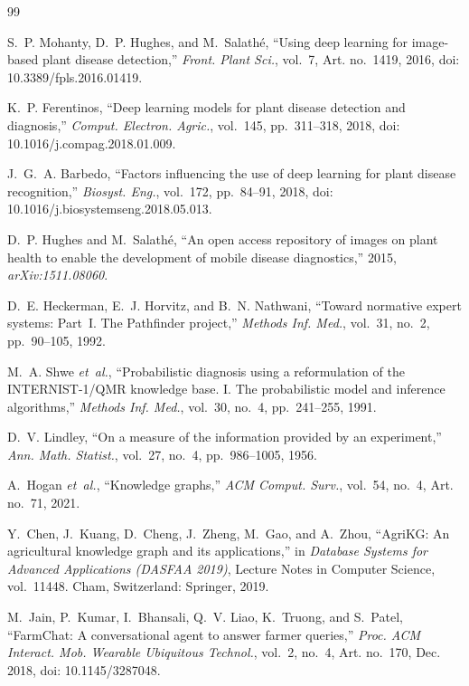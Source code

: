 \documentclass[conference]{IEEEtran}
\begin{document}
\begin{thebibliography}{99}
\footnotesize

S.~P. Mohanty, D.~P. Hughes, and M.~Salath\'{e}, ``Using deep learning for image-based plant disease detection,'' \emph{Front. Plant Sci.}, vol.~7, Art. no.~1419, 2016, doi: 10.3389/fpls.2016.01419.

K.~P. Ferentinos, ``Deep learning models for plant disease detection and diagnosis,'' \emph{Comput. Electron. Agric.}, vol.~145, pp.~311--318, 2018, doi: 10.1016/j.compag.2018.01.009.

J.~G.~A. Barbedo, ``Factors influencing the use of deep learning for plant disease recognition,'' \emph{Biosyst. Eng.}, vol.~172, pp.~84--91, 2018, doi: 10.1016/j.biosystemseng.2018.05.013.

D.~P. Hughes and M.~Salath\'{e}, ``An open access repository of images on plant health to enable the development of mobile disease diagnostics,'' 2015, \emph{arXiv:1511.08060}.

D.~E. Heckerman, E.~J. Horvitz, and B.~N. Nathwani, ``Toward normative expert systems: Part~I. The Pathfinder project,'' \emph{Methods Inf. Med.}, vol.~31, no.~2, pp.~90--105, 1992.

M.~A. Shwe \emph{et~al.}, ``Probabilistic diagnosis using a reformulation of the INTERNIST-1/QMR knowledge base. I. The probabilistic model and inference algorithms,'' \emph{Methods Inf. Med.}, vol.~30, no.~4, pp.~241--255, 1991.

D.~V. Lindley, ``On a measure of the information provided by an experiment,'' \emph{Ann. Math. Statist.}, vol.~27, no.~4, pp.~986--1005, 1956.

A.~Hogan \emph{et~al.}, ``Knowledge graphs,'' \emph{ACM Comput. Surv.}, vol.~54, no.~4, Art. no.~71, 2021.

Y.~Chen, J.~Kuang, D.~Cheng, J.~Zheng, M.~Gao, and A.~Zhou, ``AgriKG: An agricultural knowledge graph and its applications,'' in \emph{Database Systems for Advanced Applications (DASFAA 2019)}, Lecture Notes in Computer Science, vol.~11448. Cham, Switzerland: Springer, 2019.

M.~Jain, P.~Kumar, I.~Bhansali, Q.~V. Liao, K.~Truong, and S.~Patel, ``FarmChat: A conversational agent to answer farmer queries,'' \emph{Proc. ACM Interact. Mob. Wearable Ubiquitous Technol.}, vol.~2, no.~4, Art. no.~170, Dec. 2018, doi: 10.1145/3287048.


\end{thebibliography}
\end{document}
